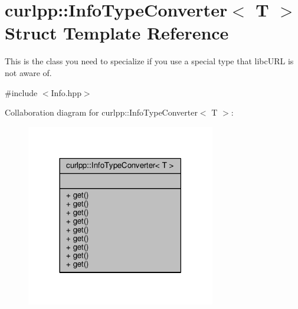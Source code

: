 \hypertarget{structcurlpp_1_1InfoTypeConverter}{\section{curlpp\-:\-:Info\-Type\-Converter$<$ T $>$ Struct Template Reference}
\label{structcurlpp_1_1InfoTypeConverter}
}


This is the class you need to specialize if you use a special type that libc\-U\-R\-L is not aware of.  




{\ttfamily \#include $<$Info.\-hpp$>$}



Collaboration diagram for curlpp\-:\-:Info\-Type\-Converter$<$ T $>$\-:\nopagebreak
\begin{figure}[H]
\begin{center}
\leavevmode
\includegraphics[width=234pt]{structcurlpp_1_1InfoTypeConverter__coll__graph}
\end{center}
\end{figure}
